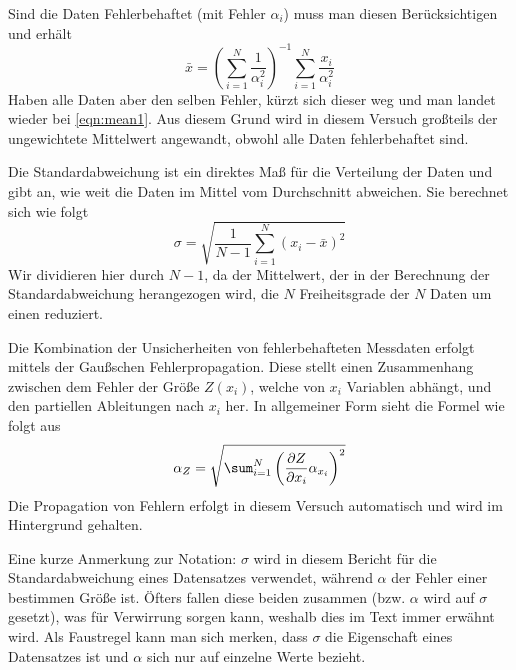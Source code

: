 Sind die Daten Fehlerbehaftet (mit Fehler \( \alpha_i \)) muss man diesen Berücksichtigen und erhält
\begin{equation}\label{eqn:mean2}
	\bar{x} = \left(\sum_{i=1}^{N} \frac{1}{\alpha_i^2}\right)^{-1} \sum_{i=1}^{N} \frac{x_i}{\alpha_i^2}
\end{equation}
Haben alle Daten aber den selben Fehler, kürzt sich dieser weg und man landet wieder bei \autoref{eqn:mean1}. Aus diesem Grund wird in diesem Versuch großteils der ungewichtete Mittelwert angewandt, obwohl alle Daten fehlerbehaftet sind. \cite[S. 50]{error}

Die Standardabweichung ist ein direktes Maß für die Verteilung der Daten und gibt an, wie weit die Daten im Mittel vom Durchschnitt abweichen. Sie berechnet sich wie folgt
\begin{equation}\label{eqn:sigma}
	\sigma = \sqrt{\frac{1}{N-1} \sum_{i=1}^{N}(x_i - \bar{x})^2}
\end{equation}
Wir dividieren hier durch \( N-1 \), da der Mittelwert, der in der Berechnung der Standardabweichung herangezogen wird, die \( N \) Freiheitsgrade der  \( N \) Daten um einen reduziert. \cite[S. 12]{error}

Die Kombination der Unsicherheiten von fehlerbehafteten Messdaten erfolgt mittels der Gaußschen Fehlerpropagation. Diese stellt einen Zusammenhang zwischen dem Fehler der Größe \( Z(x_i) \), welche von \( x_i \) Variablen abhängt, und den partiellen Ableitungen nach \( x_i \) her. In allgemeiner Form sieht die Formel wie folgt aus
\begin{equation}\label{eqn:propagation}
	\alpha_Z = \sqrt{\sum_{i=1}^{N}\left( \pdv{Z}{x_i} \alpha_{x_i}\right)^2}
\end{equation}
\cite[S. 41]{error}
Die Propagation von Fehlern erfolgt in diesem Versuch automatisch und wird im Hintergrund gehalten.

Eine kurze Anmerkung zur Notation: \( \sigma \) wird in diesem Bericht für die Standardabweichung eines Datensatzes verwendet, während \( \alpha \) der Fehler einer bestimmen Größe ist. Öfters fallen diese beiden zusammen (bzw. \( \alpha \) wird auf \( \sigma \) gesetzt), was für Verwirrung sorgen kann, weshalb dies im Text immer erwähnt wird.
Als Faustregel kann man sich merken, dass \( \sigma \) die Eigenschaft eines Datensatzes ist und \( \alpha \) sich nur auf einzelne Werte bezieht.
